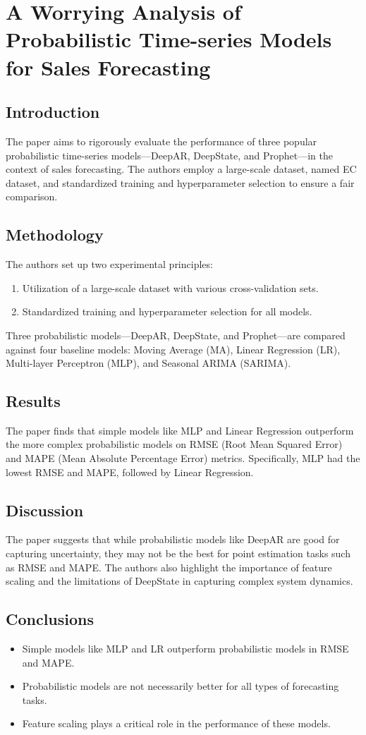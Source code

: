 \documentclass{article}
\begin{document}
\newpage
\section{A Worrying Analysis of Probabilistic Time-series Models for Sales Forecasting}

\subsection{Introduction}
The paper aims to rigorously evaluate the performance of three popular probabilistic time-series models—DeepAR, DeepState, and Prophet—in the context of sales forecasting. The authors employ a large-scale dataset, named EC dataset, and standardized training and hyperparameter selection to ensure a fair comparison.

\subsection{Methodology}
The authors set up two experimental principles:
\begin{enumerate}
    \item Utilization of a large-scale dataset with various cross-validation sets.
    \item Standardized training and hyperparameter selection for all models.
\end{enumerate}
Three probabilistic models—DeepAR, DeepState, and Prophet—are compared against four baseline models: Moving Average (MA), Linear Regression (LR), Multi-layer Perceptron (MLP), and Seasonal ARIMA (SARIMA).

\subsection{Results}
The paper finds that simple models like MLP and Linear Regression outperform the more complex probabilistic models on RMSE (Root Mean Squared Error) and MAPE (Mean Absolute Percentage Error) metrics. Specifically, MLP had the lowest RMSE and MAPE, followed by Linear Regression.

\subsection{Discussion}
The paper suggests that while probabilistic models like DeepAR are good for capturing uncertainty, they may not be the best for point estimation tasks such as RMSE and MAPE. The authors also highlight the importance of feature scaling and the limitations of DeepState in capturing complex system dynamics.

\subsection{Conclusions}
\begin{itemize}
    \item Simple models like MLP and LR outperform probabilistic models in RMSE and MAPE.
    \item Probabilistic models are not necessarily better for all types of forecasting tasks.
    \item Feature scaling plays a critical role in the performance of these models.
\end{itemize}
\end{document}

